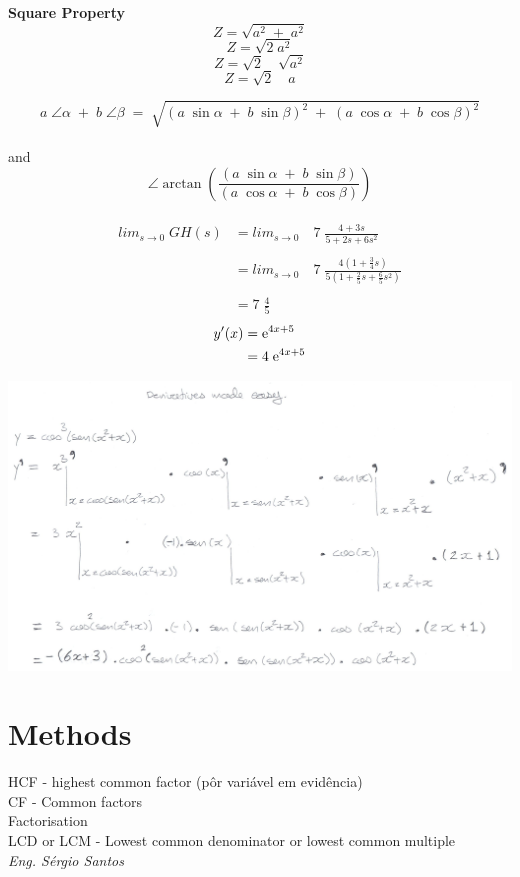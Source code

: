 \begin{minipage}[H]{0.3\linewidth}
\textbf{Square Property} \\
\[Z=\sqrt{a^2 \; + \; a^2}\]
\[Z=\sqrt{2 \; a^2}\]
\[Z=\sqrt{2} \quad \sqrt{a^2}\]
\[Z=\sqrt{2} \quad a\]
\end{minipage}
\vspace{1cm}
\[a \; \angle \alpha \; + \; b \; \angle \beta \; = \; \sqrt{(a \;  \sin \alpha \; + \; b \; \sin \beta)^2 \; + \; (a \; \cos \alpha \; + \; b \; \cos \beta)^2}\] \\
and \\
\[\angle \arctan(\frac{(a \; \sin \alpha \; + \; b \; \sin \beta)}{(a \; \cos \alpha \; + \; b \; \cos \beta)})\] \\
\begin{align*}
lim_{s \to 0} \; GH(s) & = lim_{s \to 0} \quad 7 \; \frac{4+3s}{5+2s+6s^2} \\ \\
& = lim_{s \to 0} \quad 7 \; \frac{4(1+\frac{3}{4}s)}{5(1+\frac{2}{5}s+\frac{6}{5}s^2)} \\ \\
& = 7 \; \frac{4}{5}
\end{align*}
\begin{align*}
y'(x) &= \mathrm{e}^{4x+5} \\
      &= 4 \; \mathrm{e}^{4x+5}
\end{align*}
\begin{minipage}{0.60\linewidth}
\includegraphics[scale=0.18]{./image/examples/derivativeasy.jpg}
\end{minipage}


\newpage
\section{Methods}
HCF - highest common factor (pôr variável em evidência) \\
CF - Common factors \\
Factorisation \\
LCD or LCM - Lowest common denominator or lowest common multiple \\
\newpage
\normalsize
\null \vfill
\textit{Eng. Sérgio Santos}

